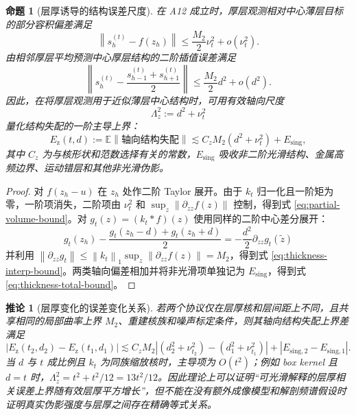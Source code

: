 \documentclass[11pt,a4paper,UTF8,fontset=fandol]{ctexart}
\newtheorem{proposition}[theorem]{命题}
\newtheorem{corollary}[theorem]{推论}
\theoremstyle{definition}
\newcommand{\norm}[1]{\left\lVert#1\right\rVert}
\newcommand{\abs}[1]{\left\lvert#1\right\rvert}
\newcommand{\E}{\mathbb{E}}
\begin{document}
\begin{proposition}[层厚诱导的结构误差尺度]
\label{prop:thickness-scale}
在 A12 成立时，厚层观测相对中心薄层目标的部分容积偏差满足
\begin{equation}
\label{eq:partial-volume-bound}
    \norm{s_h^{(t)}-f(z_h)}
    \le
    \frac{M_2}{2}\nu_t^2+o(\nu_t^2).
\end{equation}
由相邻厚层平均预测中心厚层结构的二阶插值误差满足
\begin{equation}
\label{eq:thickness-interp-bound}
    \left\|
    s_h^{(t)}-\frac{s_{h-1}^{(t)}+s_{h+1}^{(t)}}{2}
    \right\|
    \le
    \frac{M_2}{2}d^2+o(d^2).
\end{equation}
因此，在将厚层观测用于近似薄层中心结构时，可用有效轴向尺度
\begin{equation}
\label{eq:effective-z-scale}
    \Lambda_z^2:=d^2+\nu_t^2
\end{equation}
量化结构失配的一阶主导上界：
\begin{equation}
\label{eq:thickness-total-bound}
    E_{\mathrm{z}}(t,d)
    :=
    \E\norm{\text{轴向结构失配}}
    \lesssim
    C_z M_2(d^2+\nu_t^2)+E_{\mathrm{sing}},
\end{equation}
其中 $C_z$ 为与核形状和范数选择有关的常数，$E_{\mathrm{sing}}$ 吸收非二阶光滑结构、金属高频边界、运动错层和其他非光滑伪影。
\end{proposition}

\begin{proof}
对 $f(z_h-u)$ 在 $z_h$ 处作二阶 Taylor 展开。由于 $k_t$ 归一化且一阶矩为零，一阶项消失，二阶项由 $\nu_t^2$ 和 $\sup_z\norm{\partial_{zz}f(z)}$ 控制，得到式 \eqref{eq:partial-volume-bound}。对 $g_t(z)=(k_t*f)(z)$ 使用同样的二阶中心差分展开：
\begin{equation}
    g_t(z_h)-\frac{g_t(z_h-d)+g_t(z_h+d)}{2}
    =
    -\frac{d^2}{2}\partial_{zz}g_t(\tilde z)
\end{equation}
并利用 $\norm{\partial_{zz}g_t}\le \norm{k_t}_1\sup_z\norm{\partial_{zz}f(z)}=M_2$，得到式 \eqref{eq:thickness-interp-bound}。两类轴向偏差相加并将非光滑项单独记为 $E_{\mathrm{sing}}$，得到式 \eqref{eq:thickness-total-bound}。
\end{proof}

\begin{corollary}[层厚变化的误差变化关系]
\label{cor:thickness-delta}
若两个协议仅在层厚核和层间距上不同，且共享相同的局部曲率上界 $M_2$、重建核族和噪声标定条件，则其轴向结构失配上界差满足
\begin{equation}
\label{eq:thickness-error-delta}
    \abs{
    E_{\mathrm{z}}(t_2,d_2)-E_{\mathrm{z}}(t_1,d_1)
    }
    \lesssim
    C_zM_2\abs{(d_2^2+\nu_{t_2}^2)-(d_1^2+\nu_{t_1}^2)}
    +\abs{E_{\mathrm{sing},2}-E_{\mathrm{sing},1}}.
\end{equation}
当 $d$ 与 $t$ 成比例且 $k_t$ 为同族缩放核时，主导项为 $O(t^2)$；例如 box kernel 且 $d=t$ 时，$\Lambda_z^2=t^2+t^2/12=13t^2/12$。因此理论上可以证明“可光滑解释的层厚相关误差上界随有效层厚平方增长”，但不能在没有额外成像模型和解剖频谱假设时证明真实伪影强度与层厚之间存在精确等式关系。
\end{corollary}
\end{document}
